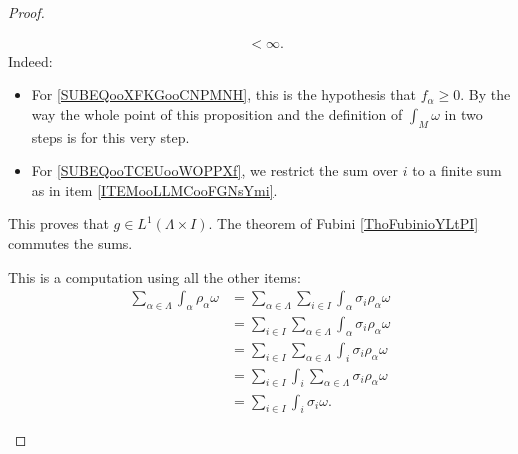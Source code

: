 \begin{proof}
\begin{subproof}
\begin{subequations}
\begin{align}
				                                                                       & <\infty.
			\end{align}
		\end{subequations}
		Indeed:
		\begin{itemize}
			\item
			      For \eqref{SUBEQooXFKGooCNPMNH}, this is the hypothesis that \( f_{\alpha}\geq 0\). By the way the whole point of this proposition and the definition of \( \int_M\omega\) in two steps is for this very step.
			\item
			      For \eqref{SUBEQooTCEUooWOPPXf}, we restrict the sum over \( i\) to a finite sum as in item \ref{ITEMooLLMCooFGNsYmi}.
		\end{itemize}
		This proves that \( g\in L^1(\Lambda\times I)\). The theorem of Fubini \ref{ThoFubinioYLtPI} commutes the sums.

		This is a computation using all the other items:
		\begin{subequations}
			\begin{align}
				\sum_{\alpha\in\Lambda}\int_{\alpha}\rho_{\alpha}\omega & =\sum_{\alpha\in\Lambda}\sum_{i\in I}\int_{\alpha}\sigma_i\rho_{\alpha}\omega  \\
				                                                        & =\sum_{i\in I}\sum_{\alpha\in \Lambda}\int_{\alpha}\sigma_i\rho_{\alpha}\omega \\
				                                                        & =\sum_{i\in I}\sum_{\alpha\in\Lambda}\int_i\sigma_i\rho_{\alpha}\omega         \\
				                                                        & =\sum_{i\in I}\int_i\sum_{\alpha\in\Lambda}\sigma_i\rho_{\alpha}\omega         \\
				                                                        & =\sum_{i\in I}\int_i\sigma_i\omega.
			\end{align}
		\end{subequations}
	\end{subproof}
\end{proof}

